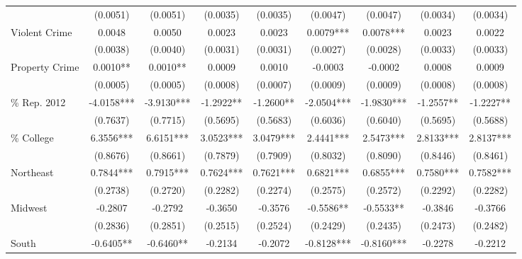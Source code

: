 \begin{table}[htbp]
\begin{tabular}{l*{8}{c}}
                    &    (0.0051)   &    (0.0051)   &    (0.0035)   &    (0.0035)   &    (0.0047)   &    (0.0047)   &    (0.0034)   &    (0.0034)   \\
Violent Crime       &      0.0048   &      0.0050   &      0.0023   &      0.0023   &      0.0079***&      0.0078***&      0.0023   &      0.0022   \\
                    &    (0.0038)   &    (0.0040)   &    (0.0031)   &    (0.0031)   &    (0.0027)   &    (0.0028)   &    (0.0033)   &    (0.0033)   \\
Property Crime      &      0.0010** &      0.0010** &      0.0009   &      0.0010   &     -0.0003   &     -0.0002   &      0.0008   &      0.0009   \\
                    &    (0.0005)   &    (0.0005)   &    (0.0008)   &    (0.0007)   &    (0.0009)   &    (0.0009)   &    (0.0008)   &    (0.0008)   \\
\% Rep. 2012        &     -4.0158***&     -3.9130***&     -1.2922** &     -1.2600** &     -2.0504***&     -1.9830***&     -1.2557** &     -1.2227** \\
                    &    (0.7637)   &    (0.7715)   &    (0.5695)   &    (0.5683)   &    (0.6036)   &    (0.6040)   &    (0.5695)   &    (0.5688)   \\
\% College          &      6.3556***&      6.6151***&      3.0523***&      3.0479***&      2.4441***&      2.5473***&      2.8133***&      2.8137***\\
                    &    (0.8676)   &    (0.8661)   &    (0.7879)   &    (0.7909)   &    (0.8032)   &    (0.8090)   &    (0.8446)   &    (0.8461)   \\
Northeast           &      0.7844***&      0.7915***&      0.7624***&      0.7621***&      0.6821***&      0.6855***&      0.7580***&      0.7582***\\
                    &    (0.2738)   &    (0.2720)   &    (0.2282)   &    (0.2274)   &    (0.2575)   &    (0.2572)   &    (0.2292)   &    (0.2282)   \\
Midwest             &     -0.2807   &     -0.2792   &     -0.3650   &     -0.3576   &     -0.5586** &     -0.5533** &     -0.3846   &     -0.3766   \\
                    &    (0.2836)   &    (0.2851)   &    (0.2515)   &    (0.2524)   &    (0.2429)   &    (0.2435)   &    (0.2473)   &    (0.2482)   \\
South               &     -0.6405** &     -0.6460** &     -0.2134   &     -0.2072   &     -0.8128***&     -0.8160***&     -0.2278   &     -0.2212   \\

\end{tabular}
\end{table}

